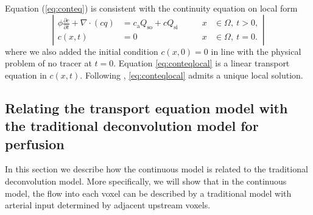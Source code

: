 \documentclass[journal,twocolumn]{IEEEtran}
\newcommand{\Qso}{Q_{\mathrm{so}}}
\newcommand{\Qsi}{Q_{\mathrm{si}}}
\newcommand{\ca}{c_\mathrm{a}}
\begin{document}
	Equation (\ref{eq:conteq}) is consistent with the continuity equation on local form
	\begin{equation}
		\left\vert
		\begin{alignedat}{2}
			\phi \frac{\partial c}{\partial t} + \nabla \cdot (cq) &= \ca\Qso + c\Qsi \qquad	&x &\in \Omega, \ t>0,  \\
			c(x,t) &= 0 																			 	&x &\in \Omega, \ t=0.
		\end{alignedat}
		\right\vert
		\label{eq:conteqlocal}
	\end{equation}
	where we also added the initial condition $c(x,0) = 0$ in line with the physical problem of no tracer at $t = 0$.
	Equation \eqref{eq:conteqlocal} is a linear transport equation in $c(x,t)$. 
	Following \cite{evans98}, \eqref{eq:conteqlocal} admits a unique local solution.


\subsection{Relating the transport equation model with the traditional deconvolution model for perfusion}\label{sec:NewAndOld}
	In this section we describe how the continuous model is related to the traditional deconvolution model.
	More specifically, we will show that in the continuous model, the flow into each voxel can be described by a traditional model with arterial input determined by adjacent upstream voxels.
	
\end{document}
